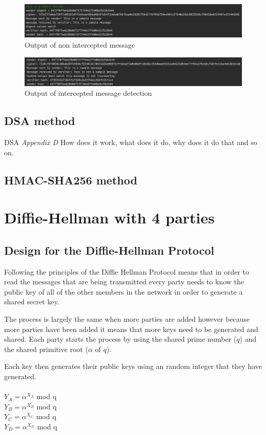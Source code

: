 \documentclass[a4paper, twoside, 11pt]{article}
\begin{document}
\begin{figure}[H]
	\centering
	\includegraphics[scale=0.5]{Images/successMessage.png}
  \caption{Output of non intercepted message}
\end{figure}


\begin{figure}[H]
	\centering
	\includegraphics[scale=0.5]{Images/interceptedMessage.png}
  \caption{Output of intercepted message detection}
\end{figure}

\subsection{DSA method}
DSA  \textit{Appendix D} How does it work, what does it do, why does it do that and so on.
\subsection{HMAC-SHA256 method}


\section{Diffie-Hellman with 4 parties}
\subsection{Design for the Diffie-Hellman Protocol}
Following the principles of the Diffie Hellman Protocol means that in order
to read the messages that are being transmitted every party needs to know the
public key of all of the other members in the network in order to generate a shared secret key.

The process is largely the same when more parties are added however because more parties have been added it means that more keys need to be generated and shared. Each party starts the process by using the shared prime number ($q$) and the shared primitive root ($\alpha$ of $q$).

Each key then generates their public keys using an random integer that they have generated. \\
\\
$Y_A = \alpha^{X_A}$ mod q \\
$Y_B = \alpha^{X_B}$ mod q \\
$Y_C = \alpha^{X_C}$ mod q \\
$Y_D = \alpha^{X_D}$ mod q \\
\end{document}
